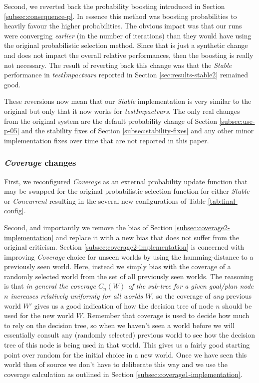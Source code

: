 \documentclass[a4paper]{article}
\newcommand{\cc}{\emph{Concurrent}\xspace}
\newcommand{\st}{\emph{Stable}\xspace}
\newcommand{\cov}{\emph{Coverage}\xspace}
\newcommand{\tiv}{\emph{testImpactvars}\xspace}
\newcommand{\dt}{{decision tree}\xspace}
\begin{document}
Second, we reverted back the probability boosting introduced in Section \ref{subsec:consequence-p}. In essence this method was boosting probabilities to heavily favour the higher probabilities. The obvious impact was that our runs were converging \textit{earlier} (in the number of iterations) than they would have using the original probabilistic selection method. Since that is just a synthetic change and does not impact the overall relative performances, then the boosting is really not necessary. The result of reverting back this change was that the \st performance in \tiv reported in Section \ref{sec:results-stable2} remained good.

These reversions now mean that our \st implementation is very similar to the original but only that it now works for \tiv. The only real changes from the original system are the default probability change of Section \ref{subsec:use-p-05} and the stability fixes of Section \ref{subsec:stability-fixes} and any other minor implementation fixes over time that are not reported in this paper.

\subsubsection{\cov changes}
\label{subsubsec:cov-rand-select}

First, we reconfigured \cov as an external probability update function that may be swapped for the original probabilistic selection function for either \st or \cc resulting in the several new configurations of Table \ref{tab:final-config}.

Second, and importantly we remove the bias of Section \ref{subsec:coverage2-implementation} and replace it with a new bias that does not suffer from the original criticism. Section \ref{subsec:coverage2-implementation} is concerned with improving \cov choice for unseen worlds by using the hamming-distance to a previously seen world. Here, instead we simply bias with the coverage of a randomly selected world from the set of all previously seen worlds. The reasoning is that \textit{in general the coverage $C_n(W)$ of the sub-tree for a given goal/plan node $n$ increases relatively uniformly for all worlds $W$}, so the coverage of \textit{any} previous world $W'$ gives us a good indication of how the \dt of node $n$ should be used for the new world $W$. Remember that coverage is used to decide how much to rely on the \dt, so when we haven't seen a world before we will essentially consult any (randomly selected) previous world to see how the \dt of this node is being used in that world. This gives us a fairly good starting point over random for the initial choice in a new world. Once we have seen this world then of source we don't have to deliberate this way and we use the coverage calculation as outlined in Section \ref{subsec:coverage1-implementation}. 
\end{document}
